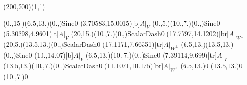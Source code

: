 \unitlength=1bp%

\begin{feynartspicture}(200,200)(1,1)

\FADiagram{}
\FAProp(0.,15.)(6.5,13.)(0.,){Sine}{0}
\FALabel(3.70583,15.0015)[b]{$A|_V$}
\FAProp(0.,5.)(10.,7.)(0.,){Sine}{0}
\FALabel(5.30398,4.9601)[t]{$A|_V$}
\FAProp(20,15.)(10.,7.)(0.,){ScalarDash}{0}
\FALabel(17.7797,14.1202)[br]{$A|_{W^\perp}$}
\FAProp(20,5.)(13.5,13.)(0.,){ScalarDash}{0}
\FALabel(17.1171,7.66351)[tr]{$A|_{W^\perp}$}
\FAProp(6.5,13.)(13.5,13.)(0.,){Sine}{0}
\FALabel(10.,14.07)[b]{$A|_V$}
\FAProp(6.5,13.)(10.,7.)(0.,){Sine}{0}
\FALabel(7.39114,9.699)[tr]{$A|_V$}
\FAProp(13.5,13.)(10.,7.)(0.,){ScalarDash}{0}
\FALabel(11.1071,10.175)[br]{$A|_{W^\perp}$}
\FAVert(6.5,13.){0}
\FAVert(13.5,13.){0}
\FAVert(10.,7.){0}
\end{feynartspicture}

